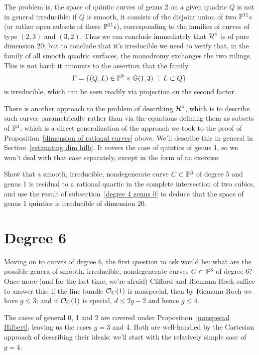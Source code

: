 The problem is, the space of quintic curves of genus 2 on a given quadric $Q$ is not in general irreducible: if $Q$ is smooth, it consists of the disjoint union of two ${\mathbb P}^{11}$s (or rather open subsets of these ${\mathbb P}^{11}$s), corresponding to the families of curves of type $(2,3)$ and $(3,2)$. Thus we can conclude immediately that ${\cal H}^\circ$ is of pure dimension 20; but to conclude that it's irreducible we need to verify that, in the family of all smooth quadric surfaces, the monodromy exchanges the two rulings. This is not hard: it amounts to the assertion that the family
$$
\Gamma = \{ (Q,L) \in {\mathbb P}^9 \times {\mathbb G}(1,3) \; \mid \; L \subset Q \}
$$
is irreducible, which can be seen readily via projection on the second factor.

There is another approach to the problem of describing ${\cal H}^\circ$, which is to describe such curves parametrically rather than via the equations defining them as subsets of ${\mathbb P}^3$, which is a direct generalization of the approach we took to the proof of Proposition~\ref{dimension of rational curves} above. We'll describe this in general in Section~\ref{estimating dim hilb}. It covers the case of quintics of genus 1, so we won't deal with that case separately, except in the form of an exercise:

\begin{exercise}
Show that a smooth, irreducible, nondegenerate curve $C \subset {\mathbb P}^3$ of degree 5 and genus 1 is residual to a rational quartic in the complete intersection of two cubics, and use the result of subsection~\ref{degree 4 genus 0} to deduce that the space of genus 1 quintics is irreducible of dimension 20.
\end{exercise}

\section{Degree 6}

Moving on to curves of degree 6, the first question to ask would be: what are the possible genera of smooth, irreducible, nondegenerate curves $C \subset {\mathbb P}^3$ of degree 6? Once more (and for the last time, we're afraid) Clifford and Riemann-Roch suffice to answer this: if the line bundle ${\mathcal O}_C(1)$ is nonspecial, then by Riemann-Roch we have $g \leq 3$; and if ${\mathcal O}_C(1)$ is special, $d \leq 2g-2$ and hence $g \leq 4$.

The cases of general 0, 1 and 2 are covered under Proposition~\ref{nonspecial Hilbert}, leaving us the cases $g = 3$ and 4. Both are well-handled by the Cartesian approach of describing their ideals; we'll start with the relatively simple case of $g=4$.

